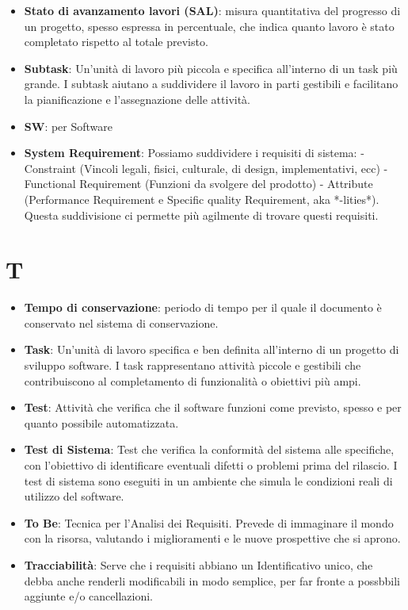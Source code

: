 \documentclass[a4paper,12pt]{article}
\begin{document}
\begin{itemize}
    \item \textbf{Stato di avanzamento lavori (SAL)}: misura quantitativa del progresso di un progetto, spesso espressa in percentuale, che indica quanto lavoro è stato completato rispetto al totale previsto.
    \item \textbf{Subtask}: Un'unità di lavoro più piccola e specifica all'interno di un task più grande. I subtask aiutano a suddividere il lavoro in parti gestibili e facilitano la pianificazione e l'assegnazione delle attività.
    \item \textbf{SW}: per Software
    \item \textbf{System Requirement}: Possiamo suddividere i requisiti di sistema: - Constraint (Vincoli legali, fisici, culturale, di design, implementativi, ecc) - Functional Requirement (Funzioni da svolgere del prodotto) - Attribute (Performance Requirement e Specific quality Requirement, aka *-lities*). Questa suddivisione ci permette più agilmente di trovare questi requisiti.
\end{itemize}
\section{T}
\begin{itemize}
    \item \textbf{Tempo di conservazione}: periodo di tempo per il quale il documento è conservato nel sistema di conservazione.
    \item \textbf{Task}: Un'unità di lavoro specifica e ben definita all'interno di un progetto di sviluppo software. I task rappresentano attività piccole e gestibili che contribuiscono al completamento di funzionalità o obiettivi più ampi.
    \item \textbf{Test}: Attività che verifica che il software funzioni come previsto, spesso e per quanto possibile automatizzata.
    \item \textbf{Test di Sistema}: Test che verifica la conformità del sistema alle specifiche, con l'obiettivo di identificare eventuali difetti o problemi prima del rilascio. I test di sistema sono eseguiti in un ambiente che simula le condizioni reali di utilizzo del software.
    \item \textbf{To Be}: Tecnica per l'Analisi dei Requisiti. Prevede di immaginare il mondo con la risorsa, valutando i miglioramenti e le nuove prospettive che si aprono.
    \item \textbf{Tracciabilità}: Serve che i requisiti abbiano un Identificativo unico, che debba anche renderli modificabili in modo semplice, per far fronte a possbbili aggiunte e/o cancellazioni.
\end{itemize}
\end{document}
